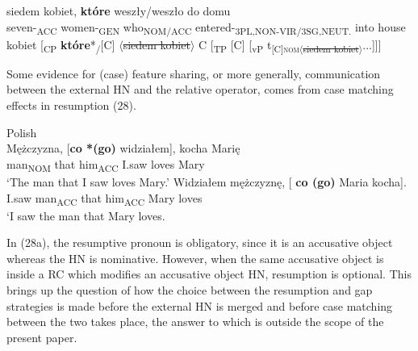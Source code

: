 \documentclass[output=paper]{langsci/langscibook}
\begin{document}

\ea%
    \label{ex:leska:27}
    \gll siedem   kobiet,   \textbf{które}     weszły/weszło       do domu\\
           seven-\textsubscript{ACC}   women-\textsubscript{GEN}   who\textsubscript{NOM/ACC}   entered-\textsubscript{3PL,NON-VIR/3SG,NEUT.} into house\\
    \glt {} kobiet [\textsubscript{CP} \textbf{które}*\textsubscript{\slash}[C] $\langle$\st{siedem kobiet}$\rangle$ C [\textsubscript{TP} [C] [\textsubscript{vP} t\textsubscript{[C]{\footnotesize\scshape nom}$\langle$\st{siedem kobiet}$\rangle$}...]]]
\z

 
Some evidence for (case) feature sharing, or more generally, communication between the external HN and the relative operator, comes from case matching effects in resumption (28).

\ea%
    Polish\label{ex:leska:28}\\
    \ea
    \gll Mężczyzna, [\textbf{co *(go)}   widziałem],   kocha   Marię     \\
          man\textsubscript{NOM}   that him\textsubscript{ACC}   I.saw     loves   Mary\\
    \glt ‘The man that I saw loves Mary.’
    \ex
    \gll  Widziałem   mężczyznę, [  \textbf{co (go)}   Maria   kocha]. \\
          I.saw     man\textsubscript{ACC}   that him\textsubscript{ACC}   Mary   loves\\
    \glt ‘I saw the man that Mary loves.
    \z
\z

In (28a), the resumptive pronoun is obligatory, since it is an accusative object whereas the HN is nominative. However, when the same accusative object is inside a RC which modifies an accusative object HN, resumption is optional. This brings up the question of how the choice between the resumption and gap strategies is made before the external HN is merged and before case matching between the two takes place, the answer to which is outside the scope of the present paper. 
\end{document}

